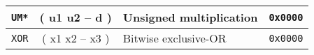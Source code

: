 \begin{center}
\begin{longtable}{|c|c|l|c|}
      \texttt{UM*}                            &
      ( u1 u2 -- d )                          &
      Unsigned multiplication                 &
      \texttt{0x0000}                           \\ \hline

      \texttt{XOR}                            &
      ( x1 x2 -- x3 )                         &
      Bitwise exclusive-OR                    &
      \texttt{0x0000}                           \\ \hline
                                  
  \end{longtable}
\end{center}  
\endgroup

